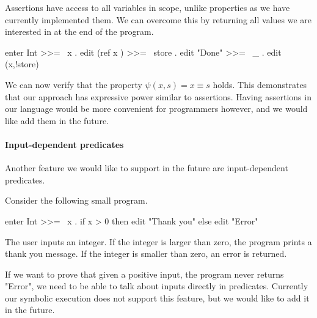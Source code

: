Assertions have access to all variables in scope, unlike properties as we have currently implemented them.
We can overcome this by returning all values we are interested in at the end of the program.
\begin{TASK}
  enter Int >>= \ x . edit (ref x ) >>= \ store . edit "Done" >>= \ _ . edit (x,!store)
\end{TASK}
We can now verify that the property $\psi(x,s) = x \equiv s$ holds.
This demonstrates that our approach has expressive power similar to assertions.
Having assertions in our language would be more convenient for programmers however, and we would like add them in the future.



\paragraph{Input-dependent predicates}

Another feature we would like to support in the future are input-dependent predicates.

\begin{example}
  Consider the following small program.

  \begin{TASK}
    enter Int >>= \ x . if x > 0 then edit "Thank you" else edit "Error"
  \end{TASK}

  The user inputs an integer.
  If the integer is larger than zero, the program prints a thank you message.
  If the integer is smaller than zero, an error is returned.
\end{example}

If we want to prove that given a positive input, the program never returns "Error", we need to be able to talk about inputs directly in predicates.
Currently our symbolic execution does not support this feature, but we would like to add it in the future.
